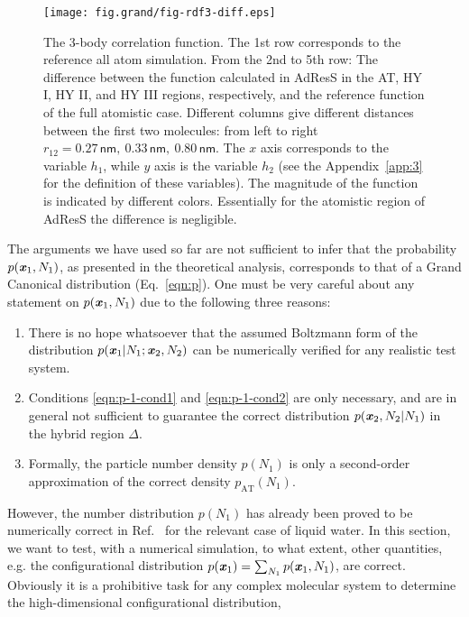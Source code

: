 \documentclass[aip,jcp,a4paper,reprint,onecolumn]{revtex4-1}
\newcommand{\vect}[1]{\textbf{\textit{#1}}}
\newcommand{\AT}{{\textrm{{AT}}}}
\newcommand{\HY}{{\Delta}}
\begin{document}
\begin{figure}
  \centering
  \texttt{[image: fig.grand/fig-rdf3-diff.eps]}
  \caption{The 3-body correlation function.  The 1st row corresponds to the reference all atom simulation.
    From the 2nd to 5th row:
    The difference between the function calculated in AdResS in the AT, HY I, HY II, and HY III
    regions, respectively, and the reference function of the full atomistic case.
    Different columns give different distances between
    the first two molecules: from left to right $r_{12} =
    0.27\,\textsf{nm},\ 0.33\,\textsf{nm},\  
    0.80\,\textsf{nm}$.  The $x$ axis corresponds to the variable $h_1$, while $y$
    axis is the variable $h_2$ (see the Appendix~\ref{app:3} for the
    definition of these variables).  The magnitude of the function is indicated by
    different colors. Essentially for the atomistic region of AdResS the difference is negligible.
  }
  \label{fig:tmp2b}
\end{figure}
The arguments we have used so far are not sufficient to infer that the probability $p(\vect x_1 , N_1)$,
as presented in the theoretical analysis, corresponds to that of a Grand Canonical distribution  (Eq.~\eqref{eqn:p}).
One must be very careful about any statement on $p(\vect x_1, N_1)$ 
due to the following three reasons:
\begin{enumerate}
\item There is no hope whatsoever that the assumed Boltzmann form of the distribution $p(\vect x_1|N_1; \vect x_2, N_2)$ can be numerically verified  for any realistic test system. 
\item Conditions \eqref{eqn:p-1-cond1} and \eqref{eqn:p-1-cond2}
are only necessary, and are in general not sufficient to guarantee
the correct distribution $p(\vect x_2, N_2 | N_1)$ in the hybrid region $\HY$.
\item Formally, the particle number density $p(N_1)$ is only a second-order approximation of the correct density $p_{\AT}(N_{1})$.
\end{enumerate}
However, the number distribution $p(N_1)$ has already
been proved to be numerically correct in Ref.~\cite{prlgc, rdfcorr} for the relevant case of liquid water. In this section, we want to test, with a numerical simulation, to what extent, other quantities, e.g. the configurational distribution $p(\vect x_1) = \sum_{N_1}p(\vect x_1, N_1)$, are correct. 
Obviously it is a prohibitive task for any complex molecular system to determine the high-dimensional configurational distribution,
\end{document}
